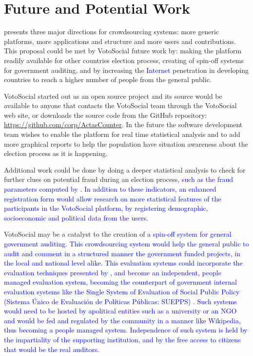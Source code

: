 \documentclass[letterpaper,10pt]{article}
\begin{document}
\section{Future and Potential Work}

\cite{doan2011} presents three major directions for crowdsourcing systems: more generic platforms, more applications and structure and more users and contributions. This proposal could be met by VotoSocial future work by: making the platform readily available for other countries election process, creating of spin-off systems for government auditing, and by increasing the \textcolor{blue}{Internet} penetration in developing countries to reach a higher number of people from the general public.

VotoSocial started out as an open source project and its source would be available to anyone that contacts the VotoSocial team through the VotoSocial web site, or downloads the source code from the GitHub repository: \url{https://github.com/corp/ActasCounter}. In the future the software development team wishes to enable the platform for real time statistical analysis and to add more graphical reports to help the population have situation awareness about the election process as it is happening.

Additional work could be done by doing a deeper statistical analysis to check for further clues on potential fraud during an election process\textcolor{blue}{, such as the fraud parameters computed by \cite{klimek2012}. In addition to these indicators, an enhanced registration form would allow research on more statistical features of the participants in the VotoSocial platform, by registering demographic, socioeconomic and political data from the users.}

VotoSocial may be a catalyst to the creation of \textcolor{blue}{a spin-off system for general government auditing. This crowdsourcing system would help the general public to audit and comment in a structured manner the government funded projects, in the local and national level alike. This evaluation systems could incorporate the evaluation techniques presented by \citep{morra2009}, and become an independent, people managed evaluation system, becoming the counterpart of government internal evaluation systems like the Single System of Evaluation of Social Public Policy (Sistema \'{U}nico de Evaluaci\'{o}n de Pol\'{i}ticas P\'{u}blicas: SUEPPS) \cite{arias2014}. Such systems would need to be hosted by apolitical entities such as a university or an NGO and would be fed and regulated by the community in a manner like Wikipedia, thus becoming a people managed system. Independence of such system is held by the impartiality of the supporting institution, and by the free access to citizens that would be the real auditors.}
\end{document}
